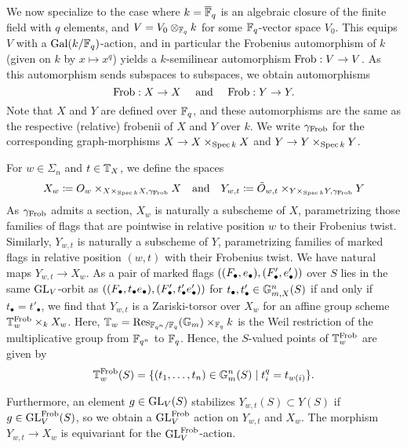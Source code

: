 \documentclass[../main.tex]{subfiles}
\begin{document}
We now specialize to the case where $k = \overline {\mathbb{F}}_q$ is an algebraic closure of 
the finite field with $q$ elements, and $V = V_0 \otimes_{\mathbb{F}_q} k$ for 
some $\mathbb{F}_q$-vector space $V_0$. 
This equips $V$ with a $\operatorname{Gal}(k/\mathbb{F}_q)$-action, and in particular the Frobenius
automorphism of $k$ (given on $k$ by $x\mapsto x^q$) yields a $k$-semilinear
automorphism $\mathrm{Frob}: V \to V$. As this automorphism sends subspaces to
subspaces, we obtain automorphisms 
\begin{equation*}
  \mathrm{Frob}: X \to X \quad \text{ and } \quad \mathrm{Frob}: Y \to Y.
\end{equation*}
Note that $X$ and $Y$ are defined over $\mathbb{F}_q$, and these automorphisms are 
the same as the respective (relative) frobenii of $X$ and $Y$ over $k$. We write
$\gamma_{\mathrm{Frob}}$ for the corresponding graph-morphisms $X \to X \times_{\operatorname{Spec} k} X$ and 
$Y \to Y\times_{\operatorname{Spec} k} Y$.

For $w \in \Sigma_n$ and $t \in \mathbb{T}_X$, we define the spaces
\begin{equation}\label{eq:defXYsigma}
  X_w \coloneqq O_w \times_{X \times_{\operatorname{Spec} k}X, \gamma_{\mathrm{Frob}}} X
  \quad \text{and} \quad
  Y_{w,t} \coloneqq \tilde O_{w,t} \times_{Y \times_{\operatorname{Spec} k}Y,
  \gamma_{\mathrm{Frob}}} Y
\end{equation}
As $\gamma_{\mathrm{Frob}}$ admits a section, $X_w$ is naturally a subscheme of $X$,
parametrizing those families of flags that are pointwise in relative position
$w$ to their Frobenius twist. Similarly, $Y_{w, t}$ is naturally a subscheme of $Y$,
parametrizing families of marked flags in relative position $(w,t)$ with their
Frobenius twist. 
We have natural maps $Y_{w, t} \to X_w$. 
As a pair of marked flags $((F_\bullet, e_\bullet), (F_\bullet', e_\bullet'))$ over $S$
lies in the same $\operatorname{GL}_V$-orbit as $((F_\bullet, t_\bullet e_\bullet), (F_\bullet', t'_\bullet
e_\bullet'))$ for $t_\bullet, t'_\bullet \in \mathbb{G}_{m,X}^n(S)$ if and only if 
$t_\bullet = t'_\bullet$, we find that $Y_{w,t}$ is a
Zariski-torsor over $X_w$ for an affine group scheme $\mathbb{T}_w^{\mathrm{Frob}} \times_k
X_w$. Here, $\mathbb{T}_w = \mathrm{Res}_{\mathbb{F}_{q^n}/\mathbb{F}_{q}}(\mathbb{G}_m) \times_{\mathbb{F}_q} k$ is the
Weil restriction of the multiplicative group from $\mathbb{F}_{q^n}$ to $\mathbb{F}_q$. 
Hence, the $S$-valued points of $\mathbb{T}_w^{\mathrm{Frob}}$ are given by
\begin{equation*}
  \mathbb{T}_{w}^{\mathrm{Frob}}(S) = \{(t_1, \dots, t_n) \in \mathbb{G}_{m}^n(S) \mid 
    t_i^q = t_{w(i)}\}.
\end{equation*}

Furthermore, an element $g \in \operatorname{GL}_V(S)$ stabilizes $Y_{w,t}(S) \subset Y(S)$ if
$g \in \operatorname{GL}_V^{\mathrm{Frob}}(S)$, so we obtain a $\operatorname{GL}_V^{\mathrm{Frob}}$ action on $Y_{w,t}$ and 
$X_w$. The morphism $Y_{w,t} \to X_w$ is equivariant for the $\operatorname{GL}_V^{\mathrm{Frob}}$-action.
\end{document}
